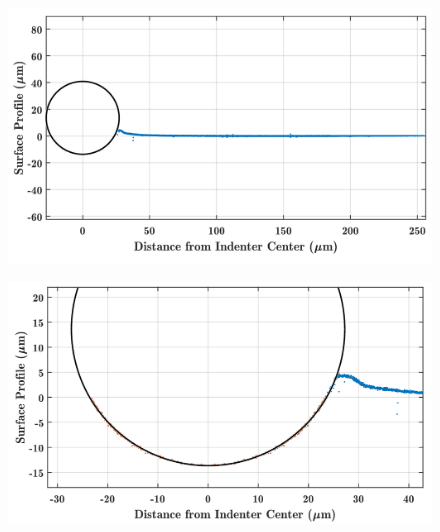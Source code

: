 \begin{figure}
	\centering
	\includegraphics[width=\linewidth]{Chapters/Figures/sphere011_ia/circle_fit}
	\caption[Circle Fit]{}
	\caption{}
	\label{fig:circlefit}
\end{figure}
\begin{figure}
	\centering
	\includegraphics[width=\linewidth]{Chapters/Figures/sphere011_ia/circle_fit_zoomed}
	\caption[Circle Fit Zoomed]{}
	\caption{}
	\label{fig:circlefitzoomed}
\end{figure}

